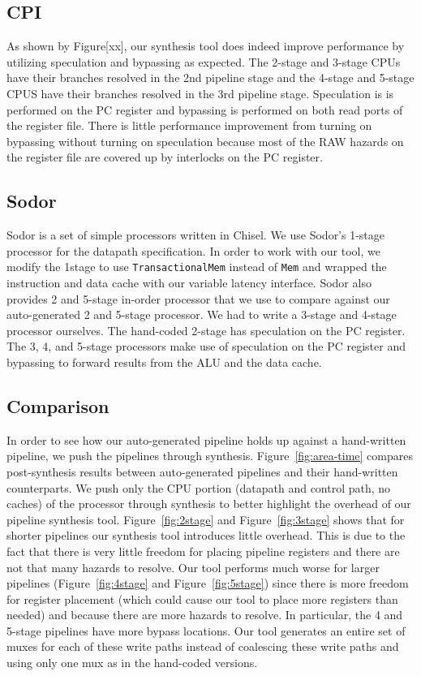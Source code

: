 \subsection{CPI}
As shown by Figure[xx], our synthesis tool does indeed improve performance by utilizing speculation and bypassing as expected. The 2-stage and 3-stage CPUs have their branches resolved in the 2nd pipeline stage and the 4-stage and 5-stage CPUS have their branches resolved in the 3rd pipeline stage. Speculation is is performed on the PC register and bypassing is performed on both read ports of the register file. There is little performance improvement from turning on bypassing without turning on speculation because most of the RAW hazards on the register file are covered up by interlocks on the PC register.
\subsection{Sodor}
Sodor is a set of simple processors written in Chisel. We use Sodor's
1-stage processor for the datapath specification. In order to work
with our tool, we modify the 1stage to use {\tt TransactionalMem}
instead of {\tt Mem} and wrapped the instruction and data cache with
our variable latency interface. Sodor also provides 2 and 5-stage
in-order processor that we use to compare against our auto-generated 2
and 5-stage processor. We had to write a 3-stage and 4-stage processor
ourselves. The hand-coded 2-stage has speculation on the PC
register. The 3, 4, and 5-stage processors make use of speculation on
the PC register and bypassing to forward results from the ALU and the
data cache.

\subsection{Comparison}
In order to see how our auto-generated pipeline holds up against a
hand-written pipeline, we push the pipelines through
synthesis. Figure~\ref{fig:area-time} compares post-synthesis results
between auto-generated pipelines and their hand-written
counterparts. We push only the CPU portion (datapath and control path,
no caches) of the processor through synthesis to better highlight the
overhead of our pipeline synthesis tool. Figure~\ref{fig:2stage} and
Figure~\ref{fig:3stage} shows that for shorter pipelines our synthesis
tool introduces little overhead. This is due to the fact that there is
very little freedom for placing pipeline registers and there are not
that many hazards to resolve. Our tool performs much worse for larger
pipelines (Figure~\ref{fig:4stage} and Figure~\ref{fig:5stage}) since
there is more freedom for register placement (which could cause our
tool to place more registers than needed) and because there are more
hazards to resolve. In particular, the 4 and 5-stage pipelines have
more bypass locations. Our tool generates an entire set of muxes for
each of these write paths instead of coalescing these write paths and
using only one mux as in the hand-coded versions.
